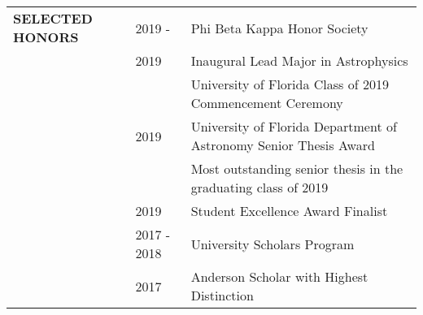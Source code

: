 \documentclass{article}
\begin{document}

\begin{tabular}{p{4cm}p{2.2cm}l}
    \large{\textbf{SELECTED \newline HONORS}} & 2019 - & Phi Beta Kappa Honor Society \vspace{-0.45cm}\\
    
    & 2019 & Inaugural Lead Major in Astrophysics \\
    && \small University of Florida Class of 2019 Commencement Ceremony \vspace{0.125cm}\\
    
    & 2019 & University of Florida Department of Astronomy Senior Thesis Award \\
    && \small Most outstanding senior thesis in the graduating class of 2019 \vspace{0.125cm}\\
    
    & 2019 & Student Excellence Award Finalist \\
    
    & 2017 - 2018 & University Scholars Program \\
    
    & 2017 & Anderson Scholar with Highest Distinction \\
    
    

\end{tabular}
\end{document}
